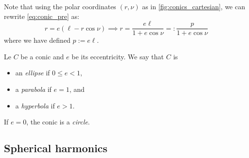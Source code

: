 \documentclass[../main.tex]{subfiles}
\begin{document}
Note that using the polar coordinates $(r,\nu)$ as in \cref{fig:conics_cartesian}, we can rewrite \cref{eq:conic_pre} as:
\begin{equation}\label{eq:conic}
  r=e(\ell - r\cos\nu)\implies r= \frac{e\ell}{1+e\cos\nu}=:\frac{p}{1+e\cos\nu}
\end{equation}
where we have defined $p:=e\ell$.
\begin{definition}
  Le $C$ be a conic and $e$ be its eccentricity. We say that $C$ is
  \begin{itemize}
    \item an \emph{ellipse} if $0\leq e<1$,
    \item a \emph{parabola} if $e=1$, and
    \item a \emph{hyperbola} if $e>1$.
  \end{itemize}
  If $e=0$, the conic is a \emph{circle}.
\end{definition}
\subsection{Spherical harmonics}
\end{document}
